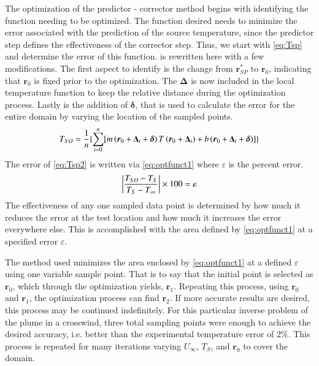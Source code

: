 \documentclass[preprint,12pt]{elsarticle}
\newcommand{\bv}[1]{\boldsymbol #1}  %
\begin{document}
The optimization of the predictor - corrector method begins with identifying the function needing to be optimized.  The function desired needs to minimize the error associated with the prediction of the source temperature, since the predictor step defines the effectiveness of the corrector step.  Thus, we start with \cref{eq:Tsp} and determine the error of this function.   is rewritten here with a few modifications.  The first aspect to identify is the change from $ \bv{r^{\ast}_{SP}}$ to $\bv{r_0}$, indicating that $\bv{r_0}$ is fixed prior to the optimization.  The $\bv{\Delta}$ is now included in the local temperature function to keep the relative distance during the optimization process.  Lastly is the addition of $\bv{\delta}$,  that is used to calculate the error for the entire domain by varying the location of the sampled points.
%
\begin{equation}
\centering
T_{SO} = \frac{1}{n} \{ \sum^{n}_{i=0} [ m\left(\bv{r_0} + \bv{\Delta_i} + \bv{\delta} \right) T\left(\bv{r_0} + \bv{\Delta_i}\right)  + b\left(\bv{r_0} + \bv{\Delta_i} + \bv{\delta}\right) ] \}
\label{eq:Tsp2}
\end{equation}
%
The error of \cref{eq:Tsp2} is written via \cref{eq:optfunct1} where $\varepsilon$ is the percent error.
%
\begin{equation}
\centering
\left| \frac{T_{SO} - T_S}{T_S-T_{\infty}}\right| \times 100 = \varepsilon 
\label{eq:optfunct1}
\end{equation}
%
The effectiveness of any one sampled data point is determined by how much it reduces the error at the test location and how much it increases the error everywhere else.  This is accomplished with the area defined by \cref{eq:optfunct1} at a specified error $\varepsilon$.

The method used minimizes the area enclosed by \cref{eq:optfunct1} at a defined $\varepsilon$ using one variable sample point.  That is to say that the initial point is selected as $\bv{r_0}$, which through the optimization yields, $\bv{r_1}$.  Repeating this process, using $\bv{r_0}$ and $\bv{r_1}$, the optimization process can find $\bv{r_2}$.  If more accurate results are desired, this process may be continued indefinitely.  For this particular inverse problem of the plume in a crosswind, three total sampling points were enough to achieve the desired accuracy, i.e. better than the experimental temperature error of $2\%$.  This process is repeated for many iterations varying $U_\infty$, $T_S$, and $\bv{r_0}$ to cover the domain.  
\end{document}
